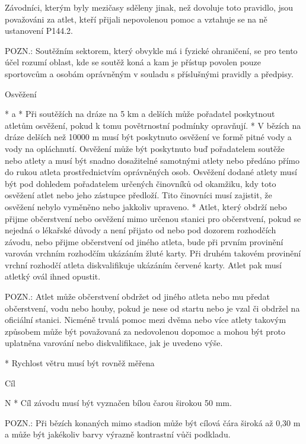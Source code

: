 Závodníci, kterým byly mezičasy sděleny jinak, než dovoluje toto pravidlo, jsou považováni za atlet, kteří přijali nepovolenou pomoc a vztahuje se na ně ustanovení P144.2.

POZN.: Soutěžním sektorem, který obvykle má i fyzické ohraničení, se pro tento účel rozumí oblast, kde se soutěž koná a kam je přístup povolen pouze sportovcům a osobám oprávněným v souladu s příslušnými pravidly a předpisy.

Osvěžení

* \begitems \style a
  * Při soutěžích na dráze na 5 km a delších může pořadatel poskytnout atletům osvěžení, pokud k tomu povětrnostní podmínky opravňují.
  * V bězích na dráze delších než 10000 m musí být poskytnuto osvěžení ve formě pitné vody a vody na opláchnutí. Osvěžení může být poskytnuto buď pořadatelem soutěže nebo atlety a musí být snadno dosažitelné samotnými atlety nebo předáno přímo do rukou atleta prostřednictvím oprávněných osob. Osvěžení dodané atlety musí být pod dohledem pořadatelem určených činovníků od okamžiku, kdy toto osvěžení atlet nebo jeho zástupce předloží. Tito činovníci musí zajistit, že osvěžení nebylo vyměněno nebo jakkoliv upraveno.
  * Atlet, který obdrží nebo přijme občerstvení nebo osvěžení mimo určenou stanici pro občerstvení, pokud se nejedná o lékařské důvody a není přijato od nebo pod dozorem rozhodčích závodu, nebo přijme občerstvení od jiného atleta, bude při prvním provinění varován vrchním rozhodčím ukázáním žluté karty. Při druhém takovém provinění vrchní rozhodčí atleta diskvalifikuje ukázáním červené karty. Atlet pak musí atletký ovál ihned opustit.
  \enditems

POZN.: Atlet může občerstvení obdržet od jiného atleta nebo mu předat občerstvení, vodu nebo houby, pokud je nese od startu nebo je vzal či obdržel na oficiální stanici. Nicméně trvalá pomoc mezi dvěma nebo více atlety takovým způsobem může být považovaná za nedovolenou dopomoc a mohou být proto uplatněna varování nebo diskvalifikace, jak je uvedeno výše.

* Rychlost větru musí být rovněž měřena

\enditems

\secc Cíl

\begitems \style N
* Cíl závodu musí být vyznačen bílou čarou širokou 50 mm.

POZN.: Při bězích konaných mimo stadion může být cílová čára široká až 0,30 m a může být jakékoliv barvy výrazně kontrastní vůči podkladu.

